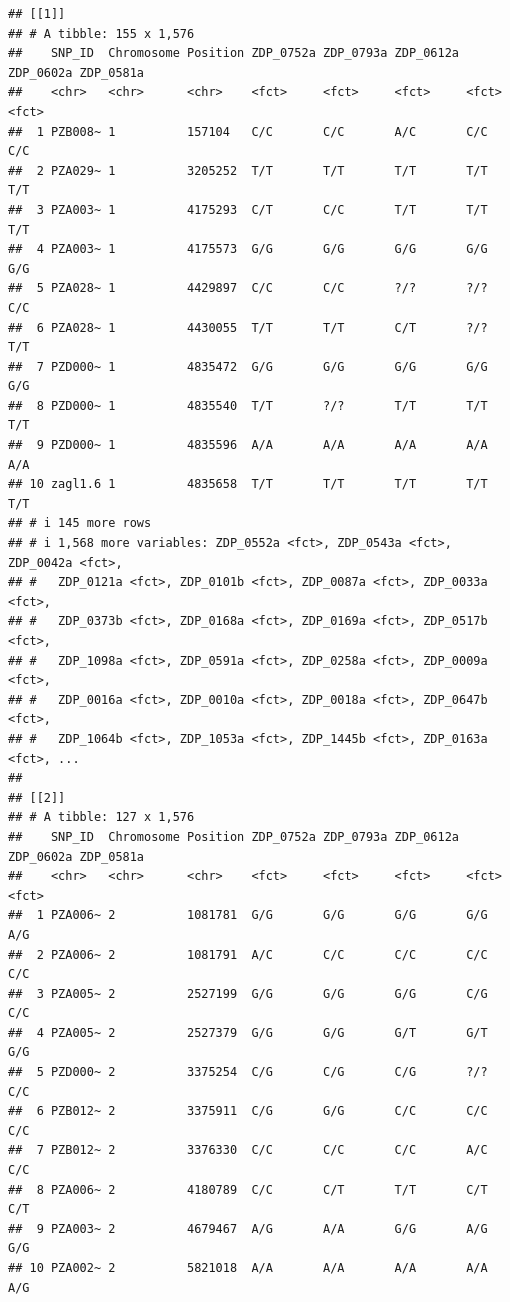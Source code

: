 \documentclass[
]{article}
\begin{document}
\begin{verbatim}
## [[1]]
## # A tibble: 155 x 1,576
##    SNP_ID  Chromosome Position ZDP_0752a ZDP_0793a ZDP_0612a ZDP_0602a ZDP_0581a
##    <chr>   <chr>      <chr>    <fct>     <fct>     <fct>     <fct>     <fct>    
##  1 PZB008~ 1          157104   C/C       C/C       A/C       C/C       C/C      
##  2 PZA029~ 1          3205252  T/T       T/T       T/T       T/T       T/T      
##  3 PZA003~ 1          4175293  C/T       C/C       T/T       T/T       T/T      
##  4 PZA003~ 1          4175573  G/G       G/G       G/G       G/G       G/G      
##  5 PZA028~ 1          4429897  C/C       C/C       ?/?       ?/?       C/C      
##  6 PZA028~ 1          4430055  T/T       T/T       C/T       ?/?       T/T      
##  7 PZD000~ 1          4835472  G/G       G/G       G/G       G/G       G/G      
##  8 PZD000~ 1          4835540  T/T       ?/?       T/T       T/T       T/T      
##  9 PZD000~ 1          4835596  A/A       A/A       A/A       A/A       A/A      
## 10 zagl1.6 1          4835658  T/T       T/T       T/T       T/T       T/T      
## # i 145 more rows
## # i 1,568 more variables: ZDP_0552a <fct>, ZDP_0543a <fct>, ZDP_0042a <fct>,
## #   ZDP_0121a <fct>, ZDP_0101b <fct>, ZDP_0087a <fct>, ZDP_0033a <fct>,
## #   ZDP_0373b <fct>, ZDP_0168a <fct>, ZDP_0169a <fct>, ZDP_0517b <fct>,
## #   ZDP_1098a <fct>, ZDP_0591a <fct>, ZDP_0258a <fct>, ZDP_0009a <fct>,
## #   ZDP_0016a <fct>, ZDP_0010a <fct>, ZDP_0018a <fct>, ZDP_0647b <fct>,
## #   ZDP_1064b <fct>, ZDP_1053a <fct>, ZDP_1445b <fct>, ZDP_0163a <fct>, ...
## 
## [[2]]
## # A tibble: 127 x 1,576
##    SNP_ID  Chromosome Position ZDP_0752a ZDP_0793a ZDP_0612a ZDP_0602a ZDP_0581a
##    <chr>   <chr>      <chr>    <fct>     <fct>     <fct>     <fct>     <fct>    
##  1 PZA006~ 2          1081781  G/G       G/G       G/G       G/G       A/G      
##  2 PZA006~ 2          1081791  A/C       C/C       C/C       C/C       C/C      
##  3 PZA005~ 2          2527199  G/G       G/G       G/G       C/G       C/C      
##  4 PZA005~ 2          2527379  G/G       G/G       G/T       G/T       G/G      
##  5 PZD000~ 2          3375254  C/G       C/G       C/G       ?/?       C/C      
##  6 PZB012~ 2          3375911  C/G       G/G       C/C       C/C       C/C      
##  7 PZB012~ 2          3376330  C/C       C/C       C/C       A/C       C/C      
##  8 PZA006~ 2          4180789  C/C       C/T       T/T       C/T       C/T      
##  9 PZA003~ 2          4679467  A/G       A/A       G/G       A/G       G/G      
## 10 PZA002~ 2          5821018  A/A       A/A       A/A       A/A       A/G      

\end{verbatim}
\end{document}
